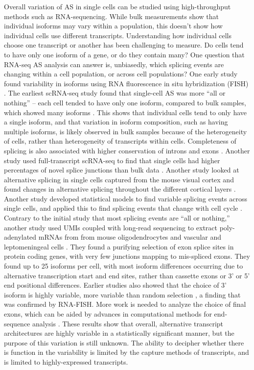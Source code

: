 Overall variation of AS in single cells can be studied using high-throughput methods such as RNA-sequencing. While bulk measurements show that individual isoforms may vary within a population, this doesn't show how individual cells use different transcripts. Understanding how individual cells choose one transcript or another has been challenging to measure. Do cells tend to have only one isoform of a gene, or do they contain many? One question that RNA-seq AS analysis can answer is, unbiasedly, which splicing events are changing within a cell population, or across cell populations? One early study found variability in isoforms using RNA fluorescence in situ hybridization (FISH) \cite{Waks2011-ye}. The earliest scRNA-seq study found that single-cell AS was more ``all or nothing'' -- each cell tended to have only one isoform, compared to bulk samples, which showed many isoforms \cite{Shalek2013-ez}. This shows that individual cells tend to only have a single isoform, and that variation in isoform composition, such as having multiple isoforms, is likely observed in bulk samples because of the heterogeneity of cells, rather than heterogeneity of transcripts within cells. Completeness of splicing is also associated with higher conservation of introns and exons \cite{Faigenbloom2015-jo}. Another study used full-transcript scRNA-seq to find that single cells had higher percentages of novel splice junctions than bulk data \cite{Marinov2014-iw}. Another study looked at alternative splicing in single cells captured from the mouse visual cortex and found changes in alternative splicing throughout the different cortical layers \cite{Tasic2016-et}. Another study developed statistical models to find variable splicing events across single cells, and applied this to find splicing events that change with cell cycle \cite{Welch2016-it}. Contrary to the initial study that most splicing events are ``all or nothing,'' another study used UMIs coupled with long-read sequencing to extract poly-adenylated mRNAs from from mouse oligodendrocytes and vascular and leptomeningeal cells \cite{Karlsson2017-wy}. They found a purifying selection of exon splice sites in protein coding genes, with very few junctions mapping to mis-spliced exons. They found up to 25 isoforms per cell, with most isoform differences occurring due to alternative transcription start and end sites, rather than cassette exons or 3' or 5' end positional differences. Earlier studies also showed that the choice of 3' isoform is highly variable, more variable than random selection \cite{Velten2015-zd}, a finding that was confirmed by RNA-FISH. More work is needed to analyze the choice of final exons, which can be aided by advances in computational methods for end-sequence analysis \cite{Derr2016-pj}. These results show that overall, alternative transcript architectures are highly variable in a statistically significant manner, but the purpose of this variation is still unknown. The ability to decipher whether there is function in the variability \cite{Arbel-Goren2014-iq,Dueck2016-mr,Symmons2016-xn,Yap:2016iga} is limited by the capture methods of transcripts, and is limited to highly-expressed transcripts.

